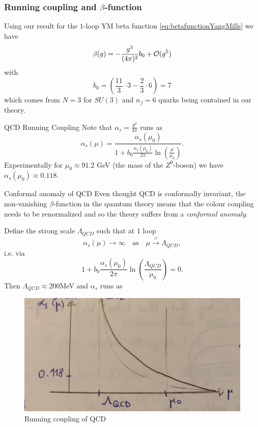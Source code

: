 \subsubsection{Running coupling and $\beta$-function}
Using our result for the $1$-loop YM beta function \ref{eq:betafunctionYangMills} we have
\begin{equation}
	\beta(g) = -\frac{g^3}{(4 \pi)^2} b_0+ \mathcal{O}(g^5)
\end{equation}
with
\begin{equation}
	b_0=\left(\frac{11}{3}\cdot 3 - \frac{2}{3} \cdot 6\right) = 7
\end{equation}
which comes from $N=3$ for $SU(3)$ and $n_f=6$ quarks being contained in our theory.\\
\begin{mybox}{QCD Running Coupling}
	Note that $\alpha_s =\frac{g^2}{4 \pi}$ runs as
	\begin{equation}
		\label{eq:qcdrunningcoupling}
		\alpha_s(\mu) = \frac{\alpha_s(\mu_0)}{1 + b_0 \frac{\alpha_s(\mu_0)}{2 \pi} \ln(\frac{\mu}{\mu_0})}.
	\end{equation}
	Experimentally for $\mu_0\approx 91.2$ GeV (the mass of the $Z^0$-boson) we have $\alpha_s(\mu_0)\approx 0.118$.\\
\end{mybox}
\begin{mybox}{Conformal anomaly of QCD}
		Even thought QCD is conformally invariant, the non-vanishing $\beta$-function in the quantum theory means that the colour coupling needs to be renormalized and so the theory suffers from a  \emph{conformal anomaly}.
\end{mybox}
Define the strong scale $\Lambda_{QCD}$ such that at $1$ loop
\begin{equation}
	\alpha_s(\mu) \rightarrow \infty \quad \text{as} \quad \mu \stackrel{>}{\rightarrow} \Lambda_{QCD},
\end{equation}
i.e. via
\begin{equation*}
	1+b_0 \frac{\alpha_s(\mu_0)}{2 \pi} \ln(\frac{\Lambda_{QCD}}{\mu_0}) =0.
\end{equation*}
Then $\Lambda_{QCD} \approx 200$MeV and $\alpha_s$ runs as 
\begin{figure}[h!]
	\centering
	\includegraphics[width=0.7\linewidth]{gfx/YMpictures/QCDrunningcoupling}
	\caption{Running coupling of QCD}
	\label{fig:qcdrunningcoupling}
\end{figure}








